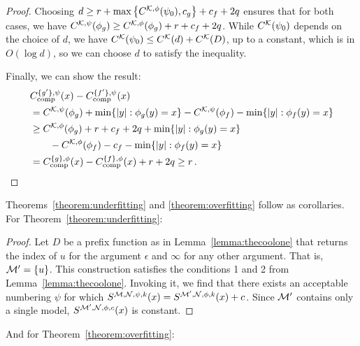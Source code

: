 \begin{proof}
Choosing $d \geq r + \max \left\{C^{{\cal K},\phi}(\psi_0), c_g \right\} + c_f + 2q$ ensures that for both cases, we have $C^{{\cal K}, \psi}(\phi_g) \geq C^{{\cal K}, \phi}(\phi_g) + r + c_f + 2q$. While $C^{\cal K}(\psi_0)$ depends on the choice of $d$, we have $C^{\cal K}(\psi_0) \leq C^{\cal K}(d) + C^{\cal K}(D)$, up to a constant, which is in $O(\log d)$, so we can choose $d$ to satisfy the inequality.  

Finally, we can show the result: \belowdisplayskip=-26pt
\begin{align*}
&C_{\textnormal{comp}}^{\{g'\}, \psi}(x) - C_{\textnormal{comp}}^{\{f'\}, \psi}(x)\\
&=C^{{\cal K}, \psi}(\phi_g) + \min\{|y| : \phi_g(y) = x\} - C^{{\cal K}, \psi}(\phi_f) - \min\{|y| : \phi_f(y) = x\}\\
&\geq C^{{\cal K}, \phi}(\phi_g) + r + c_f + 2q + \min\{|y| : \phi_g(y) = x\} \\
&\quad\quad- C^{{\cal K}, \phi}(\phi_f) - c_f - \min\{|y| : \phi_f(y) = x\} \\
&= C_{\textnormal{comp}}^{\{g\}, \phi}(x) - C_{\textnormal{comp}}^{\{f\}, \phi}(x) + r + 2q\geq r \,\text{.}\\
\end{align*}
\end{proof}
Theorems~\ref{theorem:underfitting} and \ref{theorem:overfitting} follow as corollaries. For Theorem~\ref{theorem:underfitting}:
\begin{proof}
Let $D$ be a prefix function as in Lemma~\ref{lemma:thecoolone} that returns the index of $u$ for the argument $\epsilon$ and $\infty$ for any other argument. That is, ${\cal M}' = \{u\}$. This construction satisfies the conditions 1 and 2 from Lemma~\ref{lemma:thecoolone}. Invoking it, we find that there exists an acceptable numbering $\psi$ for which $S^{{\cal M},{\cal N},\psi,k}(x) = S^{{\cal M}',{\cal N},\phi,k}(x) + c$. Since ${\cal M}'$ contains only a single model, $S^{{\cal M}',{\cal N},\phi, c}(x)$ is constant.
\end{proof}
And for Theorem~\ref{theorem:overfitting}:


